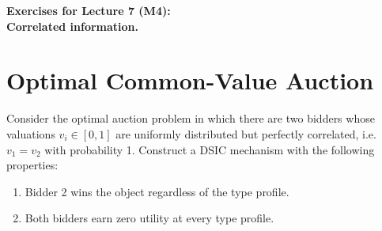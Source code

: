 \documentclass[a4paper]{article}
\newif\ifsolutions
\begin{document}
\begin{center}
		\LARGE\textbf{Exercises for Lecture 7 (M4):\\ Correlated information.}
\end{center}






\section{Optimal Common-Value Auction}
	Consider the optimal auction problem in which there are two bidders whose valuations $v_i \in [0,1]$ are uniformly distributed but 
	perfectly correlated, i.e. $v_1 = v_2$ with probability 1.  Construct a DSIC mechanism with the following properties:
	\begin{enumerate}
		\item Bidder 2 wins the object regardless of the type profile.
		\item Both bidders earn zero utility at every type profile.
	\end{enumerate}

\ifsolutions
\section*{Solution}
	Consider the following allocation:
	\[k_1(v_1,v_2)=0\]
	\[k_2(v_1,v_2)=\left\{\begin{array}{cc} 0 & \text{ if }\quad v_2\neq v_1\\
		1 & \quad\text{otherwise}\quad
		
	\end{array}
	\right.\]
	\[t_1(v_1,v_2)=0\]
	\[t_2(v_1,v_2)=\left\{\begin{array}{cc} 0 & \text{if}\quad v_2\neq v_1\\
		v_1 & \quad\text{otherwise}\quad\end{array}\right.\]
	Note that for bidder 1 it is weakly dominant to say her valuation: she never gets the good so she might as well say $v_1$. For player 2, we have exactly the same situation: given the message sent by agent 1, she is indifferent between saying the truth and not, so telling the truth is weakly dominant. Agent 2 gets the good always and both bidders have 0 utility at every type profile.
\fi 
\end{document}
